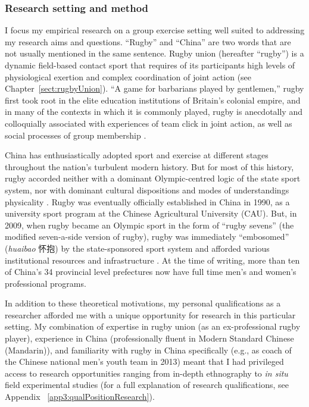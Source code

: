 \begin{CJK}{UTF8}{gbsn}
\subsubsection{Research setting and method\label{sect:researchSettingMethod}}
I focus my empirical research on a group exercise setting well suited to addressing my research aims and questions.  ``Rugby'' and ``China'' are two words that are not usually mentioned in the same sentence.  Rugby union (hereafter ``rugby'') is a dynamic field-based contact sport that requires of its participants high levels of physiological exertion and complex coordination of joint action  (see Chapter~\ref{sect:rugbyUnion}). ``A game for barbarians played by gentlemen,'' rugby first took root in the elite education institutions of Britain's colonial empire, and in many of the contexts in which it is commonly played, rugby is anecdotally and colloquially associated with experiences of team click in joint action, as well as social processes of group membership \citep{Dunning2005}.

China has enthusiastically adopted sport and exercise at different stages throughout the nation's turbulent modern history.  But for most of this history, rugby accorded neither with a dominant Olympic-centred logic of the state sport system, nor with dominant cultural dispositions and modes of understandings physicality \citep[which derived from hundreds of years of continuous history of Confucian and Daoist traditions of thought, see][]{Morris2004}.  Rugby was eventually officially established in China in 1990, as a university sport program at the Chinese Agricultural University (CAU).  But, in 2009, when rugby became an Olympic sport in the form of ``rugby sevens'' (the modified seven-a-side version of rugby), rugby was immediately ``embosomed'' (\textit{huaibao} 怀抱) by the state-sponsored sport system and afforded various institutional resources and infrastructure \citep{Xu2010}.  At the time of writing, more than ten of China's 34 provincial level prefectures now have full time men's and women's professional programs.

In addition to these theoretical motivations, my personal qualifications as a researcher afforded me with a unique opportunity for research in this particular setting.  My combination of expertise in rugby union (as an ex-professional rugby player), experience in China (professionally fluent in Modern Standard Chinese (Mandarin)), and familiarity with rugby in China specifically (e.g., as coach of the Chinese national men's youth team in 2013) meant that I had privileged access to research opportunities ranging from in-depth ethnography to \textit{in situ} field experimental studies (for a full explanation of research qualifications, see Appendix ~\ref{app3:qualPositionResearch}).


\end{CJK}
